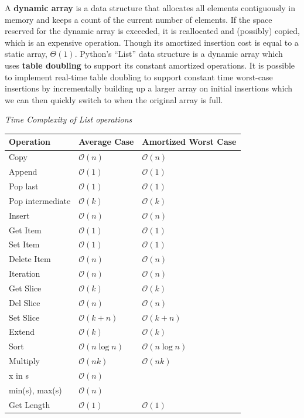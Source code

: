 \documentclass{article}
\newcommand{\bigO}{\mathcal{O}}
\begin{document}
    A \textbf{dynamic array} is a data structure that allocates all elements contiguously in memory and keeps a count of the current number of elements. If the space reserved for the dynamic array is exceeded, it is reallocated and (possibly) copied, which is an expensive operation. Though its amortized insertion cost is equal to a static array, $\Theta(1)$. Python's  ``List'' data structure is a dynamic array which uses \textbf{table doubling} to support its constant amortized operations. It is possible to implement real-time table doubling to support constant time worst-case insertions by incrementally building up a larger array on initial insertions which we can then quickly switch to when the original array is full.
    
    \vspace{8pt} \emph{Time Complexity of List operations}
    \begin{table}[H]
        \begin{tabular}{|l|l|l|}
            \hline
            \textbf{Operation} & \textbf{Average Case} & \textbf{Amortized Worst Case} \\
            \hline
            Copy & $\bigO(n)$ & $\bigO(n)$ \\
            Append & $\bigO(1)$ & $\bigO(1)$\\
            Pop last & $\bigO(1)$ & $\bigO(1)$ \\
            Pop intermediate & $\bigO(k)$ & $\bigO(k)$ \\
            Insert & $\bigO(n)$ & $\bigO(n)$ \\
            Get Item & $\bigO(1)$ & $\bigO(1)$ \\
            Set Item & $\bigO(1)$ & $\bigO(1)$ \\
            Delete Item & $\bigO(n)$ & $\bigO(n)$ \\
            Iteration & $\bigO(n)$ & $\bigO(n)$ \\
            Get Slice & $\bigO(k)$ & $\bigO(k)$\\
            Del Slice & $\bigO(n)$ & $\bigO(n)$ \\
            Set Slice & $\bigO(k+n)$ & $\bigO(k+n)$\\
            Extend & $\bigO(k)$ & $\bigO(k)$\\
            Sort & $\bigO(n\log n)$ &$\bigO(n\log n)$\\
            Multiply & $\bigO(nk)$ & $\bigO(nk)$ \\
            x in s & $\bigO(n)$ &  \\
            min(s), max(s) & $\bigO(n)$ & \\
            Get Length & $\bigO(1)$ & $\bigO(1)$ \\
            \hline
        \end{tabular}
    \end{table}
\end{document}
